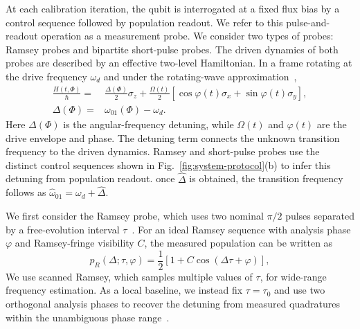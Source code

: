 At each calibration iteration, the qubit is interrogated at a fixed flux bias
by a control sequence followed by population readout. We refer to this
pulse-and-readout operation as a measurement probe. We consider two types of
probes: Ramsey probes and bipartite short-pulse probes. The driven dynamics of
both probes are described by an effective two-level Hamiltonian. In a frame
rotating at the drive frequency $\omega_d$ and under the rotating-wave
approximation~\cite{krantz2019quantum,blais2021circuit},
\begin{equation}
\begin{aligned}
\frac{H(t,\Phi)}{\hbar}
={}&
\frac{\Delta(\Phi)}{2}\sigma_z
+
\frac{\Omega(t)}{2}
\left[
\cos\varphi(t)\sigma_x
+
\sin\varphi(t)\sigma_y
\right],
\\
\Delta(\Phi)
={}&
\omega_{01}(\Phi)-\omega_d .
\end{aligned}
\label{eq:hamiltonian}
\end{equation}
%
Here $\Delta(\Phi)$ is the angular-frequency detuning, while $\Omega(t)$ and
$\varphi(t)$ are the drive envelope and phase. The detuning term connects the
unknown transition frequency to the driven dynamics. Ramsey and short-pulse
probes use the distinct control sequences shown in
Fig.~\ref{fig:system-protocol}(b) to infer this detuning from population
readout. once $\widehat\Delta$ is obtained, the transition frequency follows
as $\widehat\omega_{01}=\omega_d+\widehat\Delta$.


We first consider the Ramsey probe, which uses two nominal $\pi/2$ pulses
separated by a free-evolution interval $\tau$~\cite{ramsey1950molecular}. For an ideal Ramsey sequence with analysis phase $\varphi$ and Ramsey-fringe visibility $C$, the measured population can be written as
\begin{equation}
    p_R(\Delta; \tau, \varphi) = \frac{1}{2}\left[ 1 + C\cos(\Delta\tau + \varphi) \right],
    \label{eq:ramsey-response}
\end{equation}
We use scanned Ramsey, which samples
multiple values of $\tau$, for wide-range frequency estimation. As a local
baseline, we instead fix $\tau=\tau_0$ and use two orthogonal analysis phases
to recover the detuning from measured quadratures within the unambiguous phase
range~\cite{vepsalainen2022improving}. 

